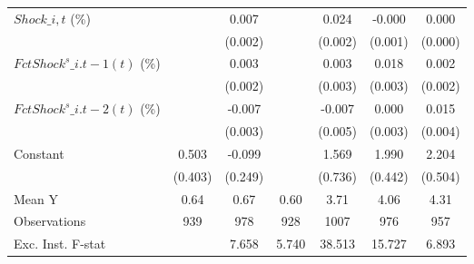 {\begin{tabular}{l*{6}{c}}
\addlinespace
$ Shock\_{i,t}$ (\%) &                     &       0.007\sym{***}&                     &       0.024\sym{***}&      -0.000         &       0.000         \\
                    &                     &     (0.002)         &                     &     (0.002)         &     (0.001)         &     (0.000)         \\
\addlinespace
$ FctShock^s\_{i.t-1}(t)$ (\%)&                     &       0.003\sym{*}  &                     &       0.003         &       0.018\sym{***}&       0.002         \\
                    &                     &     (0.002)         &                     &     (0.003)         &     (0.003)         &     (0.002)         \\
\addlinespace
$ FctShock^s\_{i.t-2}(t)$ (\%)&                     &      -0.007\sym{**} &                     &      -0.007         &       0.000         &       0.015\sym{***}\\
                    &                     &     (0.003)         &                     &     (0.005)         &     (0.003)         &     (0.004)         \\
\addlinespace
Constant            &       0.503         &      -0.099         &                     &       1.569\sym{**} &       1.990\sym{***}&       2.204\sym{***}\\
                    &     (0.403)         &     (0.249)         &                     &     (0.736)         &     (0.442)         &     (0.504)         \\
\midrule
Mean Y              &        0.64         &        0.67         &        0.60         &        3.71         &        4.06         &        4.31         \\
Observations        &         939         &         978         &         928         &        1007         &         976         &         957         \\
Exc. Inst. F-stat   &                     &       7.658         &       5.740         &      38.513         &      15.727         &       6.893         \\
\bottomrule
\end{tabular}
}
